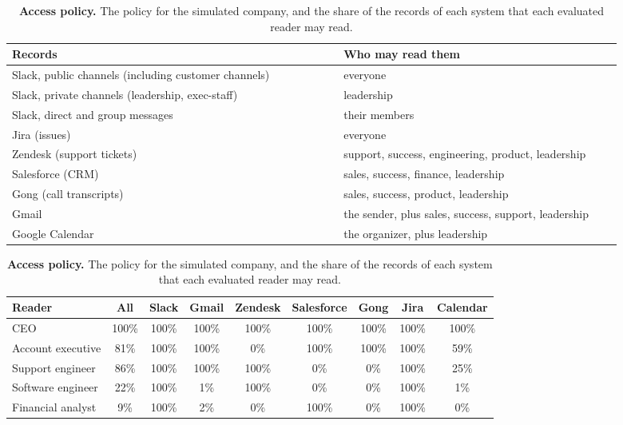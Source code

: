 \documentclass[11pt]{article}
\begin{document}
\begin{table}[h]
\centering
\small
\caption{\textbf{Access policy.} The policy for the simulated company, and the share of the records of each system that each evaluated reader may read.}
\label{tab:policy}
\begin{tabular}{p{0.5\linewidth}p{0.42\linewidth}}
\toprule
Records & Who may read them \\
\midrule
Slack, public channels (including customer channels) & everyone \\
Slack, private channels (leadership, exec-staff) & leadership \\
Slack, direct and group messages & their members \\
Jira (issues) & everyone \\
Zendesk (support tickets) & support, success, engineering, product, leadership \\
Salesforce (CRM) & sales, success, finance, leadership \\
Gong (call transcripts) & sales, success, product, leadership \\
Gmail & the sender, plus sales, success, support, leadership \\
Google Calendar & the organizer, plus leadership \\
\bottomrule
\end{tabular}

\vspace{6pt}

\setlength{\tabcolsep}{4pt}\begin{tabular}{lcccccccc}
\toprule
Reader & All & Slack & Gmail & Zendesk & Salesforce & Gong & Jira & Calendar \\
\midrule
CEO & 100\% & 100\% & 100\% & 100\% & 100\% & 100\% & 100\% & 100\% \\
Account executive & 81\% & 100\% & 100\% & 0\% & 100\% & 100\% & 100\% & 59\% \\
Support engineer & 86\% & 100\% & 100\% & 100\% & 0\% & 0\% & 100\% & 25\% \\
Software engineer & 22\% & 100\% & 1\% & 100\% & 0\% & 0\% & 100\% & 1\% \\
Financial analyst & 9\% & 100\% & 2\% & 0\% & 100\% & 0\% & 100\% & 0\% \\
\bottomrule
\end{tabular}
\end{table}
\end{document}
